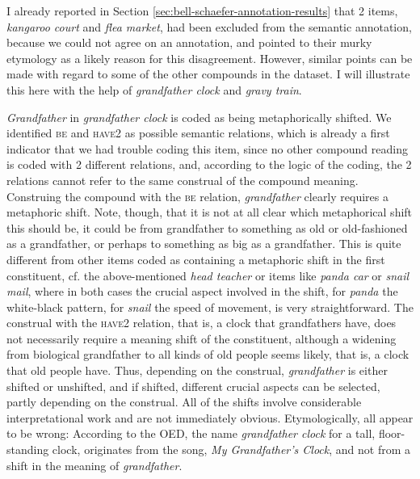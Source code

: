 I already reported in Section \ref{sec:bell-schaefer-annotation-results} that 2 items, \emph{kangaroo court} and
\emph{flea market}, had been excluded from the semantic annotation,
because we could not agree on an annotation, and pointed to their
murky etymology as a likely reason for this disagreement. However,
similar points can be made with regard to some of the other compounds
in the dataset. I will illustrate this here with the help of
\emph{grandfather clock} and \emph{gravy train}. 

\emph{Grandfather} in \emph{grandfather clock}
is coded as being metaphorically shifted. We identified \textsc{be} and \textsc{have2}
as possible semantic relations, which is already a first indicator
that we had trouble coding this item, since no other compound reading
is coded with 2 different relations, and, according to the logic of
the coding, the 2 relations cannot refer to the same construal of
the compound meaning. Construing the compound with the \textsc{be} relation, \emph{grandfather}
clearly requires a metaphoric shift. Note, though, that it is not at all clear which metaphorical shift this should be, it could be from grandfather to something as old or
old-fashioned as a grandfather, or perhaps to something as big as a
grandfather. This is quite different from other items coded as
containing a metaphoric shift in the first constituent, cf. the
above-mentioned \emph{head teacher} or items like
\emph{panda car} or \emph{snail mail}, where in both cases the crucial
aspect involved in the shift, for \emph{panda} the white-black
pattern, for \emph{snail} the speed of movement, is very
straightforward.
The construal with the \textsc{have2} relation, that is, a clock that
grandfathers have, does not necessarily
require a meaning shift of the constituent, although a widening from
biological grandfather to all kinds of old people seems likely, that
is, a clock that old people have. Thus, depending on the construal,
\emph{grandfather} is either shifted or unshifted, and if shifted,
different crucial aspects can be selected, partly depending on the
construal. All of the shifts involve considerable interpretational
work and are not immediately obvious. Etymologically, all appear to be wrong:
According to the OED, the name \emph{grandfather clock} for a tall,
floor-standing clock, originates from the song, \emph{My Grandfather’s
Clock}, and not from a shift in the meaning of \emph{grandfather}. 

